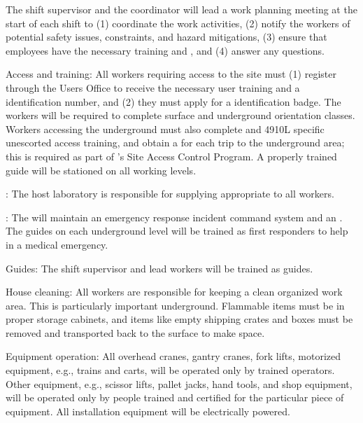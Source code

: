 The shift supervisor and the  coordinator  will lead a work planning meeting at the start of each shift  to (1) coordinate the work activities, (2) notify the workers of potential safety issues, constraints, and hazard mitigations, (3) ensure that employees have the necessary  training and , and (4) answer any questions.

{Access and training:}  All  workers requiring access to the  site must (1) register through the  Users Office to receive the necessary user training and a  identification number, and (2) they must apply for a  identification badge. 
The workers will be required to complete  surface and underground orientation classes. Workers accessing the underground must also complete  and 4910L specific unescorted access training, and obtain a  for each trip to the underground area; this is required as part of 's Site Access Control Program. 
A properly trained guide will be stationed on all working levels. 

{:} 
The host laboratory is responsible for supplying appropriate  to all workers. 

{:} The  will maintain an emergency response incident command system and an .  The guides on each underground level will be trained as first responders to help in a medical emergency.
  
  Guides: The shift supervisor and lead workers will be trained as guides.
  
  {House cleaning:} All workers are responsible for keeping a clean organized work area. This is particularly important underground. Flammable items must be in proper storage cabinets, and items like empty shipping crates and boxes must be removed and 
transported back to the surface to make space.


{Equipment operation:} All overhead cranes, gantry cranes, fork lifts, motorized equipment, e.g., trains and carts, will be operated only by trained  operators. 
Other equipment, e.g., scissor lifts, pallet jacks, hand tools, and shop equipment, will be operated only by people trained
and certified for the particular piece of equipment. All installation equipment will be electrically powered.
